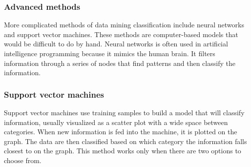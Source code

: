 \documentclass[]{report}
\begin{document}
\subsubsection*{Advanced methods}
More complicated methods of data mining classification include neural networks and support vector machines. These methods are computer-based models that would be difficult to do by hand. Neural networks is often used in artificial intelligence programming because it mimics the human brain. It filters information through a series of nodes that find patterns and then classify the information.

\subsubsection*{Support vector machines }
Support vector machines use training samples to build a model that will classify information, usually visualized as a scatter plot with a wide space between categories. When new information is fed into the machine, it is plotted on the graph. The data are then classified based on which category the information falls closest to on the graph. This method works only when there are two options to choose from.
\end{document}
